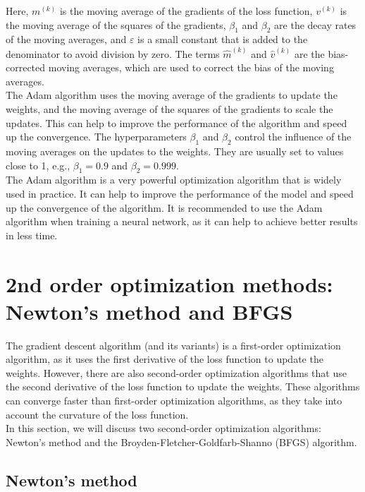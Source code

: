 Here, $m^{(k)}$ is the moving average of the gradients of the loss function, $v^{(k)}$ is the moving
average of the squares of the gradients, $\beta_1$ and $\beta_2$ are the decay rates of the moving
averages, and $\varepsilon$ is a small constant that is added to the denominator to avoid division by
zero. The terms $\hat{m}^{(k)}$ and $\hat{v}^{(k)}$ are the bias-corrected moving averages, which are
used to correct the bias of the moving averages.\\

The Adam algorithm uses the moving average of the gradients to update the weights, and the moving
average of the squares of the gradients to scale the updates. This can help to improve the performance
of the algorithm and speed up the convergence. The hyperparameters $\beta_1$ and $\beta_2$ control the
influence of the moving averages on the updates to the weights. They are usually set to values close to
1, e.g., $\beta_1 = 0.9$ and $\beta_2 = 0.999$.\\

The Adam algorithm is a very powerful optimization algorithm that is widely used in practice. It can
help to improve the performance of the model and speed up the convergence of the algorithm. It is
recommended to use the Adam algorithm when training a neural network, as it can help to achieve better
results in less time.

\section{2nd order optimization methods: Newton's method and BFGS}

The gradient descent algorithm (and its variants) is a first-order optimization algorithm, as it
uses the first derivative of the loss function to update the weights. However, there are also
second-order optimization algorithms that use the second derivative of the loss function to update
the weights. These algorithms can converge faster than first-order optimization algorithms, as they
take into account the curvature of the loss function.\\

In this section, we will discuss two second-order optimization algorithms: Newton's method and the
Broyden-Fletcher-Goldfarb-Shanno (BFGS) algorithm.

\subsection{Newton's method}


